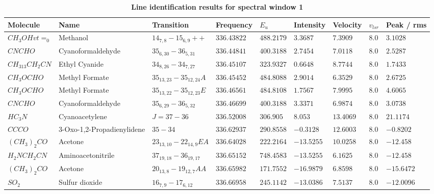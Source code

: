\documentclass[10pt]{article}
\begin{document}
   \newpage
   \begin{table}[htb]  
    \caption{\textbf{Line identification results for spectral window 1}}
    \small
    \centering    
    \begin{tabular}{l l l l l l l l l} 
    \hline     
    Molecule & Name &Transition & Frequency & $E_{u}$ & Intensity & Velocity & $v_{lsr}$ & Peak / rms\\ 
    \hline
$CH_{3}OHvt=_{0}$ & Methanol & $14_{7,8}-15_{6,9}++$ & $336.43822$ & $488.2179$ & $3.3687$ & $7.3909$ & $8.0$ & $3.1028$\\
$CNCHO$ & Cyanoformaldehyde & $35_{6,30}-36_{5,31}$ & $336.44841$ & $400.3188$ & $2.7454$ & $7.0118$ & $8.0$ & $2.5287$\\
$CH_{313}CH_{2}CN$ & Ethyl Cyanide & $34_{8,26}-34_{7,27}$ & $336.45107$ & $323.9327$ & $0.6648$ & $8.7744$ & $8.0$ & $1.7433$\\
$CH_{3}OCHO$ & Methyl Formate & $35_{13,23}-35_{12,24}A$ & $336.45452$ & $484.8088$ & $2.9014$ & $6.3529$ & $8.0$ & $2.6725$\\
$CH_{3}OCHO$ & Methyl Formate & $35_{13,22}-35_{12,23}E$ & $336.46561$ & $484.8108$ & $1.7567$ & $7.9995$ & $8.0$ & $4.6065$\\
$CNCHO$ & Cyanoformaldehyde & $35_{6,29}-36_{5,32}$ & $336.46699$ & $400.3188$ & $3.3371$ & $6.9874$ & $8.0$ & $3.0738$\\
$HC_{3}N$ & Cyanoacetylene & $J=37-36$ & $336.52008$ & $306.905$ & $8.053$ & $13.4069$ & $8.0$ & $21.1174$\\
$CCCO$ & 3-Oxo-1,2-Propadienylidene & $35-34$ & $336.62937$ & $290.8558$ & $-0.3128$ & $12.6003$ & $8.0$ & $-0.8202$\\
$(CH_{3})_{2}CO$ & Acetone & $23_{13,10}-22_{14,9}EA$ & $336.64028$ & $222.2164$ & $-13.5255$ & $10.0258$ & $8.0$ & $-12.458$\\
$H_{2}NCH_{2}CN$ & Aminoacetonitrile & $37_{19,18}-36_{19,17}$ & $336.65152$ & $748.4583$ & $-13.5255$ & $6.1625$ & $8.0$ & $-12.458$\\
$(CH_{3})_{2}CO$ & Acetone & $20_{13,8}-19_{12,7}AA$ & $336.65982$ & $171.7552$ & $-16.9879$ & $6.8598$ & $8.0$ & $-15.6472$\\
$SO_{2}$ & Sulfur dioxide & $16_{7,9}-17_{6,12}$ & $336.66958$ & $245.1142$ & $-13.0386$ & $7.5137$ & $8.0$ & $-12.0096$\\
    \hline                  
    \end{tabular}
\end{table}
\end{document}
